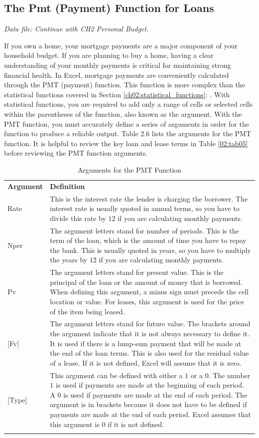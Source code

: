 \subsection{The Pmt (Payment) Function for Loans}

\textit{Data file: Continue with CH2 Personal Budget.}

If you own a home, your mortgage payments are a major component of your household budget. If you are planning to buy a home, having a clear understanding of your monthly payments is critical for maintaining strong financial health. In Excel, mortgage payments are conveniently calculated through the PMT (payment) function. This function is more complex than the statistical functions covered in Section \ref{ch02:statistical_functions}: . With statistical functions, you are required to add only a range of cells or selected cells within the parentheses of the function, also known as the argument. With the PMT function, you must accurately define a series of arguments in order for the function to produce a reliable output. Table 2.6 lists the arguments for the PMT function. It is helpful to review the key loan and lease terms in Table \ref{02:tab05} before reviewing the PMT function arguments.

{\small
	\begin{longtable}{p{0.75in}p{3.5in}}
		\textbf{Argument} & \textbf{Definition}\endhead
		\hline \\
		Rate & This is the interest rate the lender is charging the borrower. The interest rate is usually quoted in annual terms, so you have to divide this rate by $ 12 $ if you are calculating monthly payments.\\
		Nper & The argument letters stand for number of periods. This is the term of the loan, which is the amount of time you have to repay the bank. This is usually quoted in years, so you have to multiply the years by $ 12 $ if you are calculating monthly payments.\\
		Pv & The argument letters stand for present value. This is the principal of the loan or the amount of money that is borrowed. When defining this argument, a minus sign must precede the cell location or value. For leases, this argument is used for the price of the item being leased.\\
		{[Fv]} & The argument letters stand for future value. The brackets around the argument indicate that it is not always necessary to define it. It is used if there is a lump-sum payment that will be made at the end of the loan terms. This is also used for the residual value of a lease. If it is not defined, Excel will assume that it is zero.\\
		{[Type]} & This argument can be defined with either a $ 1 $ or a $ 0 $. The number $ 1 $ is used if payments are made at the beginning of each period. A $ 0 $ is used if payments are made at the end of each period. The argument is in brackets because it does not have to be defined if payments are made at the end of each period. Excel assumes that this argument is $ 0 $ if it is not defined.\\
		\caption{Arguments for the PMT Function}
		\label{02:tab06}
	\end{longtable}
}

